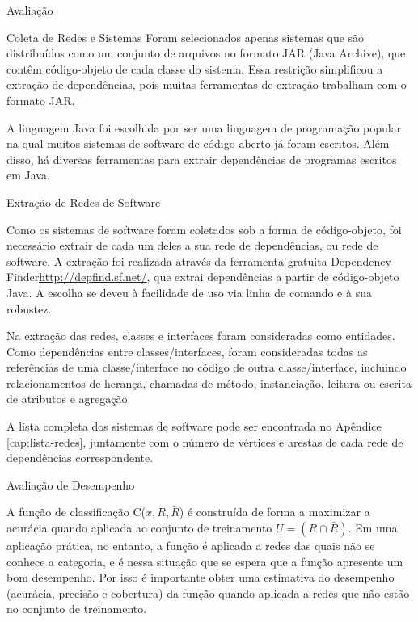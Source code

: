 \begin{section}{Avaliação}
\begin{subsection}{Coleta de Redes e Sistemas}
		Foram selecionados apenas sistemas que são distribuídos como um conjunto de arquivos no formato JAR (Java Archive), que contêm código-objeto de cada classe do sistema. Essa restrição simplificou a extração de dependências, pois muitas ferramentas de extração trabalham com o formato JAR.

		A linguagem Java foi escolhida por ser uma linguagem de programação popular na qual muitos sistemas de software de código aberto já foram escritos. Além disso, há diversas ferramentas para extrair dependências de programas escritos em Java.

\end{subsection}

\begin{subsection}{Extração de Redes de Software}

		Como os sistemas de software foram coletados sob a forma de código-objeto, foi necessário extrair de cada um deles a sua rede de dependências, ou rede de software. A extração foi realizada através da ferramenta gratuita Dependency Finder\url{http://depfind.sf.net/}, que extrai dependências a partir de código-objeto Java. A escolha se deveu à facilidade de uso via linha de comando e à sua robustez.

		Na extração das redes, classes e interfaces foram consideradas como entidades. Como dependências entre classes/interfaces, foram consideradas todas as referências de uma classe/interface no código de outra classe/interface, incluindo relacionamentos de herança, chamadas de método, instanciação, leitura ou escrita de atributos e agregação.

		A lista completa dos sistemas de software pode ser encontrada no Apêndice \ref{cap:lista-redes}, juntamente com o número de vértices e arestas de cada rede de dependências correspondente.

\end{subsection}

\begin{subsection}{Avaliação de Desempenho}

	A função de classificação C($x, R, \bar{R}$) é construída de forma a maximizar a acurácia quando aplicada ao conjunto de treinamento $U = (R \cap \bar{R})$. Em uma aplicação prática, no entanto, a função é aplicada a redes das quais não se conhece a categoria, e é nessa situação que se espera que a função apresente um bom desempenho. Por isso é importante obter uma estimativa do desempenho (acurácia, precisão e cobertura) da função quando aplicada a redes que não estão no conjunto de treinamento.
	

\end{subsection}
\end{section}
